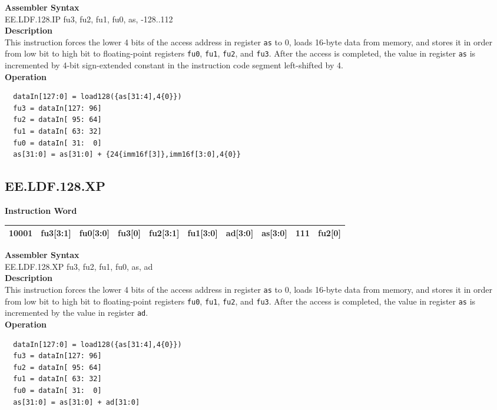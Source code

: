 \textbf{Assembler Syntax} \\
EE.LDF.128.IP fu3, fu2, fu1, fu0, as, -128..112 \\
\textbf{Description} \\
This instruction forces the lower 4 bits of the access address in register \lstinline{as} to 0, loads 16-byte data from memory, and stores it in order from low bit to high bit to floating-point registers \lstinline{fu0}, \lstinline{fu1}, \lstinline{fu2}, and \lstinline{fu3}. After the access is completed, the value in register \lstinline{as} is incremented by 4-bit sign-extended constant in the instruction code segment left-shifted by 4.\\
\textbf{Operation}
\begin{lstlisting}
  dataIn[127:0] = load128({as[31:4],4{0}})
  fu3 = dataIn[127: 96]
  fu2 = dataIn[ 95: 64]
  fu1 = dataIn[ 63: 32]
  fu0 = dataIn[ 31:  0]
  as[31:0] = as[31:0] + {24{imm16f[3]},imm16f[3:0],4{0}}
\end{lstlisting}

\clearpage
\subsection{EE.LDF.128.XP}\label{instruction:EELDF128XP}
\setlength\tabcolsep{6pt}
\textbf{Instruction Word} \\
\begin{tabular}{|c|c|c|c|c|c|c|c|c|c|}
	\hline
	10001 & fu3[3:1] & fu0[3:0] & fu3[0] & fu2[3:1] & fu1[3:0] & ad[3:0] & as[3:0] & 111 & fu2[0] \\
	\hline
\end{tabular}

\textbf{Assembler Syntax} \\
EE.LDF.128.XP fu3, fu2, fu1, fu0, as, ad \\
\textbf{Description} \\
This instruction forces the lower 4 bits of the access address in register \lstinline{as} to 0, loads 16-byte data from memory, and stores it in order from low bit to high bit to floating-point registers \lstinline{fu0}, \lstinline{fu1}, \lstinline{fu2}, and \lstinline{fu3}. After the access is completed, the value in register \lstinline{as} is incremented by the value in register \lstinline{ad}.\\
\textbf{Operation}
\begin{lstlisting}
  dataIn[127:0] = load128({as[31:4],4{0}})
  fu3 = dataIn[127: 96]
  fu2 = dataIn[ 95: 64]
  fu1 = dataIn[ 63: 32]
  fu0 = dataIn[ 31:  0]
  as[31:0] = as[31:0] + ad[31:0]
\end{lstlisting}

